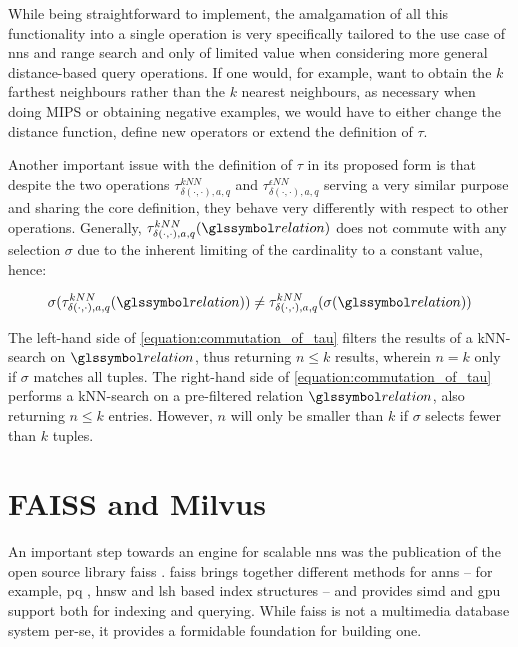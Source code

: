 While being straightforward to implement, the amalgamation of all this functionality into a single operation is very specifically tailored to the use case of \acrshort{nns} and range search and only of limited value when considering more general distance-based query operations. If one would, for example, want to obtain the $k$ farthest neighbours rather than the $k$ nearest neighbours, as necessary when doing MIPS or obtaining negative examples, we would have to either change the distance function, define new operators or extend the definition of $\tau$. 

Another important issue with the definition of $\tau$ in its proposed form is that despite the two operations $\tau^{kNN}_{\delta(\cdot,\cdot),a,q}$ and $\tau^{\epsilon NN}_{\delta(\cdot,\cdot),a,q}$ serving a very similar purpose and sharing the core definition, they behave very differently with respect to other operations. Generally, $\tau^{kNN}_{\delta(\cdot,\cdot),a,q}(\relation)$ does not commute with any selection $\sigma$ due to the inherent limiting of the cardinality to a constant value, hence:

\begin{equation}
    \label{equation:commutation_of_tau}
    \sigma(\tau^{kNN}_{\delta(\cdot,\cdot),a,q}(\relation)) \neq \tau^{kNN}_{\delta(\cdot,\cdot),a,q}(\sigma(\relation))
\end{equation}

The left-hand side of \cref{equation:commutation_of_tau} filters the results of a kNN-search on $\relation$, thus returning $n \leq k$ results, wherein $n = k$ only if $\sigma$ matches all tuples. The right-hand side of \cref{equation:commutation_of_tau} performs a kNN-search on a pre-filtered relation $\relation$, also returning $n \leq k$ entries. However, $n$ will only be smaller than $k$ if $\sigma$ selects fewer than $k$ tuples.

\section{FAISS and Milvus}

An important step towards an engine for scalable \acrshort{nns} was the publication of the open source library \acrfull{faiss} \cite{Johnson:2019Billion}. \acrshort{faiss} brings together different methods for \acrshort{anns} -- for example, \acrshort{pq} \cite{Jegou:2010Product}, \acrshort{hnsw} \cite{Malkov:2018Efficient} and \acrshort{lsh} \cite{Indyk1998:Approximate} based index structures -- and provides  \acrshort{simd} and \acrshort{gpu} support both for indexing and querying. While \acrshort{faiss} is not a multimedia database system per-se, it provides a formidable foundation for building one.

